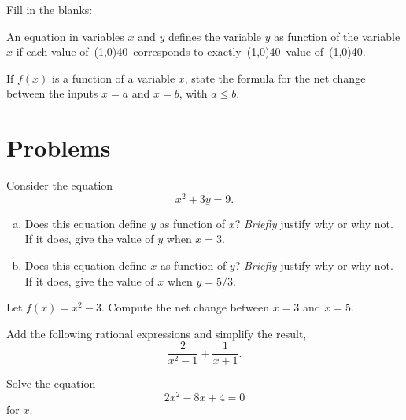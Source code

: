 \documentclass[12pt]{amsart}
\begin{document}
\begin{thm}[3 Points]\label{ex5}
  Fill in the blanks:\\
  \begin{center}
    An equation in variables $x$ and $y$ defines the variable $y$ as function of the variable $x$ if each value of\ \line(1,0){40}\ corresponds to exactly\ \line(1,0){40}\ value of\ \line(1,0){40}.
  \end{center}
  \vspace{1in}
\end{thm}

\begin{thm}[3 Points]\label{ex6}
  If $f(x)$ is a function of a variable $x$, state the formula for the net change between the inputs $x = a$ and $x = b$, with $a \leq b$.
\end{thm}

\newpage
\section{Problems}
\begin{thm}[16 Points]\label{ex7}
  Consider the equation
  $$x^2 + 3y = 9.$$
  \begin{enumerate}[(a)]
    \item
      Does this equation define $y$ as function of $x$?  
      {\it Briefly} justify why or why not.
      If it does, give the value of $y$ when $x = 3$.
      \vspace{2in}
    \item
      Does this equation define $x$ as function of $y$?  {\it Briefly} justify why or why not.
      If it does, give the value of $x$ when $y = 5/3$.
      \vspace{2in}
  \end{enumerate}
\end{thm}

\begin{thm}[16 Points]\label{ex8}
  Let $f(x) = x^2 - 3$.  Compute the net change between $x = 3$ and $x = 5$.
\end{thm}

\newpage

\begin{thm}[16 Points]\label{ex9}
  Add the following rational expressions and simplify the result,
  $$\frac{2}{x^2 - 1} + \frac{1}{x+1}.$$
\end{thm}

\newpage

\begin{thm}[16 Points]\label{ex10}
  Solve the equation
  $$2x^2 - 8x + 4 = 0$$
  for $x$.
  \vspace{3in}
\end{thm}
\end{document}
